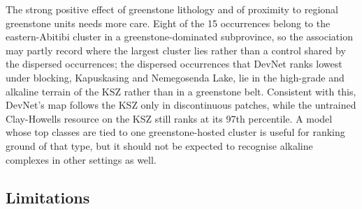 \documentclass[pdflatex,sn-apa]{sn-jnl}
\begin{document}
The strong positive effect of greenstone lithology and of proximity to regional greenstone units needs more care. Eight of the 15 occurrences belong to the eastern-Abitibi cluster in a greenstone-dominated subprovince, so the association may partly record where the largest cluster lies rather than a control shared by the dispersed occurrences; the dispersed occurrences that DevNet ranks lowest under blocking, Kapuskasing and Nemegosenda Lake, lie in the high-grade and alkaline terrain of the KSZ rather than in a greenstone belt. Consistent with this, DevNet's map follows the KSZ only in discontinuous patches, while the untrained Clay-Howells resource on the KSZ still ranks at its 97th percentile. A model whose top classes are tied to one greenstone-hosted cluster is useful for ranking ground of that type, but it should not be expected to recognise alkaline complexes in other settings as well.

\subsection{Limitations}\label{sec:limitations}
\end{document}
